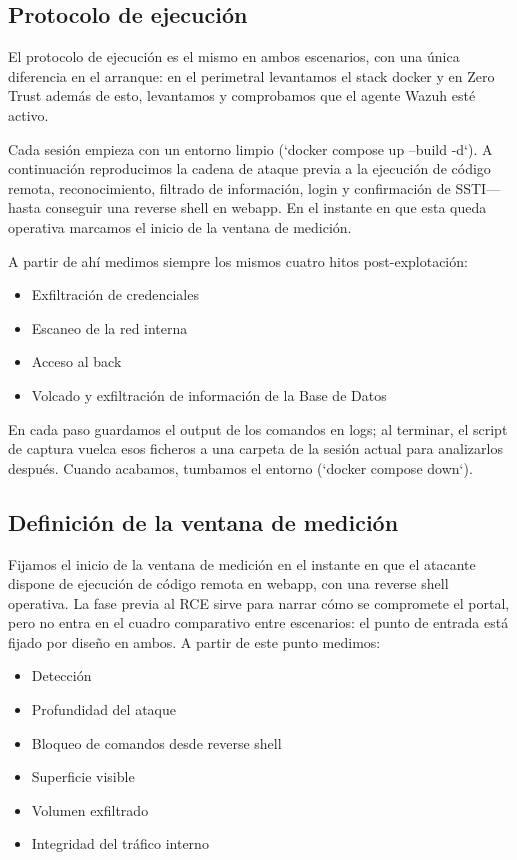 \documentclass[11pt,spanish,listoffigures,listoftables]{tfgetsinf}
\begin{document}
        \subsection{Protocolo de ejecución}
        El protocolo de ejecución es el mismo en ambos escenarios, con una única diferencia en el arranque: en el perimetral levantamos el stack docker y en Zero Trust además de esto, levantamos y comprobamos que el agente Wazuh esté activo.

        Cada sesión empieza con un entorno limpio (`docker compose up --build -d`). A continuación reproducimos la cadena de ataque previa a la ejecución de código remota, reconocimiento, filtrado de información, login y confirmación de SSTI— hasta conseguir una reverse shell en webapp. En el instante en que esta queda operativa marcamos el inicio de la ventana de medición.
        
        A partir de ahí medimos siempre los mismos cuatro hitos post-explotación:
        \begin{itemize}
            \item Exfiltración de credenciales
            \item Escaneo de la red interna
            \item Acceso al back
            \item Volcado y exfiltración de información de la Base de Datos
        \end{itemize}
        
        En cada paso guardamos el output de los comandos en logs; al terminar, el script de captura vuelca esos ficheros a una carpeta de la sesión actual para analizarlos después. Cuando acabamos, tumbamos el entorno (`docker compose down`).
        
        \subsection{Definición de la ventana de medición}
        Fijamos el inicio de la ventana de medición en el instante en que el atacante dispone de ejecución de código remota en webapp, con una reverse shell operativa. La fase previa al RCE sirve para narrar cómo se compromete el portal, pero no entra en el cuadro comparativo entre escenarios: el punto de entrada está fijado por diseño en ambos. A partir de este punto medimos:
        \begin{itemize}
            \item Detección
            \item Profundidad del ataque
            \item Bloqueo de comandos desde reverse shell
            \item Superficie visible
            \item Volumen exfiltrado
            \item Integridad del tráfico interno
        \end{itemize}
        
\end{document}
